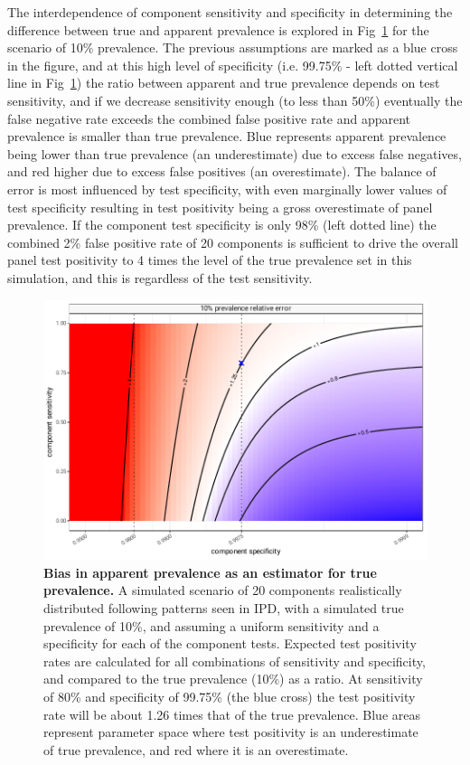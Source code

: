 \documentclass[10pt,letterpaper]{article}
\begin{document}
The interdependence of component sensitivity and specificity in determining the difference between true and apparent prevalence is explored in Fig~\ref{fig4} for the scenario of 10\% prevalence. The previous assumptions are marked as a blue cross in the figure, and at this high level of specificity (i.e. 99.75\% - left dotted vertical line in Fig~\ref{fig4}) the ratio between apparent and true prevalence depends on test sensitivity, and if we decrease sensitivity enough (to less than 50\%) eventually the false negative rate exceeds the combined false positive rate and apparent prevalence is smaller than true prevalence. Blue represents apparent prevalence being lower than true prevalence (an underestimate) due to excess false negatives, and red higher due to excess false positives (an overestimate). The balance of error is most influenced by test specificity, with even marginally lower values of test specificity resulting in test positivity being a gross overestimate of panel prevalence. If the component test specificity is only 98\% (left dotted line) the combined 2\% false positive rate of 20 components is sufficient to drive the overall panel test positivity to 4 times the level of the true prevalence set in this simulation, and this is regardless of the test sensitivity.

\begin{figure}[h!]
\centerline{\includegraphics{fig/impact-error-by-sensitivity-specificity.pdf}}
\caption{{\bf Bias in apparent prevalence as an estimator for true prevalence.}
A simulated scenario of 20 components realistically distributed following patterns seen in IPD, with a simulated true prevalence of 10\%, and assuming a uniform sensitivity and a specificity for each of the component tests. Expected test positivity rates are calculated for all combinations of sensitivity and specificity, and compared to the true prevalence (10\%) as a ratio. At sensitivity of 80\% and specificity of 99.75\% (the blue cross) the test positivity rate will be about 1.26 times that of the true prevalence. Blue areas represent parameter space where test positivity is an underestimate of true prevalence, and red where it is an overestimate.}
\label{fig4}
\end{figure}
\end{document}
